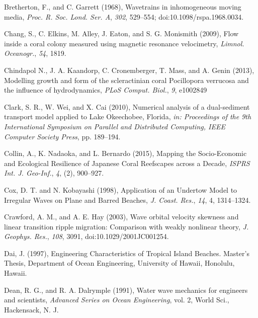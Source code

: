 \documentclass[default,jgrga]{agutex2015}
\begin{document}
\begin{article}
\begin{thebibliography}{}
Bretherton, F., and C. Garrett (1968), Wavetrains in inhomogeneous moving media, \textit{Proc. R. Soc. Lond. Ser. A}, \textit{302}, 529--554; doi:10.1098/rspa.1968.0034.

Chang, S., C. Elkins, M. Alley, J. Eaton, and S. G. Monismith (2009), Flow inside a coral colony measured using magnetic
resonance velocimetry, \textit{Limnol. Oceanogr.}, \textit{54}, 1819.

Chindapol N., J. A. Kaandorp, C. Cronemberger, T. Mass, and A. Genin (2013), Modelling growth and form of the scleractinian coral Pocillopora verrucosa and the influence of hydrodynamics, \textit{PLoS Comput. Biol.}, \textit{9}, e1002849

Clark, S. R., W. Wei, and X. Cai (2010), Numerical analysis of a dual-sediment transport model applied to Lake Okeechobee, Florida, \textit{in: Proceedings of the 9th International Symposium on Parallel and Distributed Computing, IEEE Computer Society Press}, pp. 189--194.

Collin, A., K. Nadaoka, and L. Bernardo (2015), Mapping the Socio-Economic and Ecological Resilience of Japanese Coral Reefscapes across a Decade, \textit{ISPRS Int. J. Geo-Inf.}, \textit{4}, (2), 900--927.

Cox, D. T. and N. Kobayashi (1998), Application of an Undertow Model to Irregular Waves on Plane and Barred Beaches, \textit{J. Coast. Res.}, \textit{14}, 4, 1314--1324.

Crawford, A. M., and A. E. Hay (2003), Wave orbital velocity skewness and linear transition ripple migration: Comparison with weakly nonlinear theory, \textit{J. Geophys. Res.}, \textit{108}, 3091, doi:10.1029/2001JC001254.

Dai, J. (1997), Engineering Characteristics of Tropical Island Beaches. Master's Thesis, Department of Ocean Engineering, University of Hawaii, Honolulu, Hawaii.

Dean, R. G., and R. A. Dalrymple (1991), Water wave mechanics for engineers and scientists, \textit{Advanced Series on Ocean Engineering}, vol. 2, World Sci., Hackensack, N. J.


\end{thebibliography}
\end{article}
\end{document}
